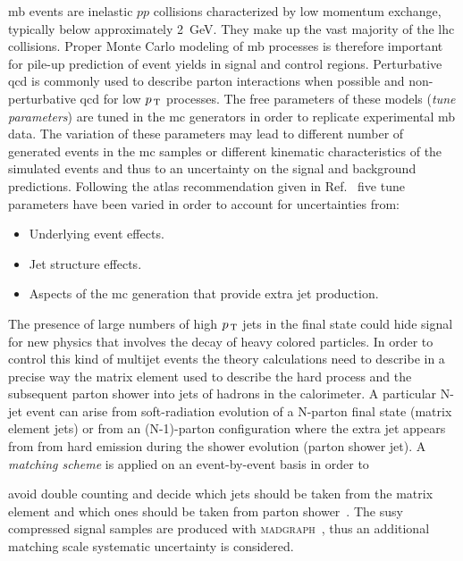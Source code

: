 \gls{mb} events are inelastic $pp$ collisions characterized by low momentum
exchange, typically below approximately 2~GeV. They make up the vast majority of
the \gls{lhc} collisions. Proper Monte Carlo modeling of \gls{mb} processes is
therefore important for pile-up prediction of event yields in signal and control
regions. Perturbative \gls{qcd} is commonly used to describe parton interactions
when possible and non-perturbative \gls{qcd} for low $p_\mathrm{\, T}$ processes. The free
parameters of these models (\emph{tune parameters}) are tuned in the \gls{mc}
generators in order to replicate experimental \gls{mb} data. The variation of
these parameters may lead to different number of generated events in the
\gls{mc} samples or different kinematic characteristics of the simulated events
and thus to an uncertainty on the signal and background predictions. Following
the \gls{atlas} recommendation given in Ref.~\cite{MCTuningRecommendations2015}
five tune parameters have been varied in order to account for uncertainties
from:
\begin{itemize}
\item Underlying event effects.
\item Jet structure effects.
\item Aspects of the \gls{mc} generation that provide extra jet production.
\end{itemize}

The presence of large numbers of high $p_\mathrm{\, T}$ jets in the final state could hide
signal for new physics that involves the decay of heavy colored particles. In
order to control this kind of multijet events the theory calculations need to
describe in a precise way the matrix element used to describe the hard process
and the subsequent parton shower into jets of hadrons in the calorimeter. A
particular N-jet event can arise from soft-radiation evolution of a N-parton
final state (matrix element jets) or from an (N-1)-parton configuration where
the extra jet appears from from hard emission during the shower evolution
(parton shower jet). A \emph{matching scheme} is applied on an event-by-event
basis in order to

avoid double counting and decide which jets should be taken from the matrix
element and which ones should be taken from parton shower~\cite{Matching}. The
\gls{susy} compressed signal samples are produced with
\textsc{madgraph}~\cite{MADGRAPH}, thus an additional matching scale systematic
uncertainty is considered. %


